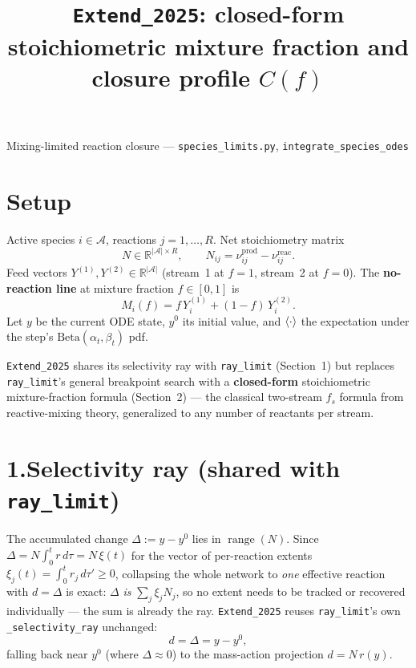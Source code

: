 \documentclass[11pt]{article}
\title{\vspace{-1.5em}\textbf{\large \texttt{Extend\_2025}: closed-form stoichiometric
mixture fraction and closure profile \(C(f)\)}}
\author{}
\date{}
\newcommand{\reac}{\mathrm{reac}}
\newcommand{\prodsup}{\mathrm{prod}}
\newcommand{\code}[1]{\texttt{\small #1}}
\DeclarePairedDelimiter{\avg}{\langle}{\rangle}
\begin{document}
\maketitle
\vspace{-3.5em}
\begin{center}
\textcolor{gray!70!black}{\small Mixing-limited reaction closure \quad---\quad
\code{species\_limits.py}, \code{integrate\_species\_odes}}
\end{center}
\vspace{0.4em}

\section*{Setup}

Active species \(i\in\mathcal{A}\), reactions \(j=1,\dots,R\). Net stoichiometry matrix
\[
N\in\mathbb{R}^{|\mathcal{A}|\times R},\qquad
N_{ij}=\nu^{\prodsup}_{ij}-\nu^{\reac}_{ij}.
\]
Feed vectors \(Y^{(1)},Y^{(2)}\in\mathbb{R}^{|\mathcal{A}|}\) (stream~1 at \(f=1\),
stream~2 at \(f=0\)). The \textbf{no-reaction line} at mixture fraction \(f\in[0,1]\) is
\[
M_i(f)=f\,Y^{(1)}_i+(1-f)\,Y^{(2)}_i.
\]
Let \(y\) be the current ODE state, \(y^0\) its initial value, and \(\avg{\cdot}\) the
expectation under the step's \(\mathrm{Beta}(\alpha_t,\beta_t)\) pdf.

\texttt{Extend\_2025} shares its selectivity ray with \texttt{ray\_limit} (Section~1)
but replaces \texttt{ray\_limit}'s general breakpoint search with a \textbf{closed-form}
stoichiometric mixture-fraction formula (Section~2) --- the classical two-stream
\(f_s\) formula from reactive-mixing theory, generalized to any number of reactants per
stream.

\section*{1.\quad Selectivity ray (shared with \texttt{ray\_limit})}

The accumulated change \(\Delta:=y-y^0\) lies in \(\operatorname{range}(N)\). Since
\(\Delta=N\int_0^t r\,d\tau=N\,\xi(t)\) for the vector of per-reaction extents
\(\xi_j(t)=\int_0^t r_j\,d\tau'\ge 0\), collapsing the whole network to \emph{one}
effective reaction with \(d=\Delta\) is exact: \(\Delta\) \emph{is}
\(\sum_j\xi_j N_j\), so no extent needs to be tracked or recovered individually --- the
sum is already the ray. \texttt{Extend\_2025} reuses \texttt{ray\_limit}'s own
\code{\_selectivity\_ray} unchanged:
\[
d = \Delta = y - y^0,
\]
falling back near \(y^0\) (where \(\Delta\approx 0\)) to the mass-action projection
\(d = N\,r(y)\).
\end{document}
